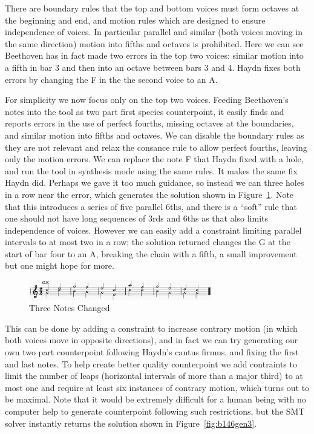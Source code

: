 \documentclass[sigplan,screen]{acmart}
\begin{document}
There are boundary rules that the top and bottom voices must form
octaves at the beginning and end, and motion rules which are designed
to ensure independence of voices. In particular parallel and similar
(both voices moving in the same direction) motion into fifths and
octaves is prohibited. Here we can see Beethoven has in fact made two
errors in the top two voices: similar motion into a fifth in bar 3 and
then into an octave between bars 3 and 4. Haydn fixes both errors by
changing the F in the the second voice to an A.

For simplicity we now focus only on the top two voices. Feeding
Beethoven's notes into the tool as two part first species
counterpoint, it easily finds and reports errors in the use of perfect
fourths, missing octaves at the boundaries, and similar motion into
fifths and octaves. We can disable the boundary rules as they are not
relevant and relax the consance rule to allow perfect fourths, leaving
only the motion errors. We can replace the note F that Haydn fixed
with a hole, and run the tool in synthesis mode using the same
rules. It makes the same fix Haydn did. Perhaps we gave it too much
guidance, so instead we can three holes in a row near the error, which
generates the solution shown in Figure~\ref{fig:b146fix3}. Note that
this introduces a series of five parallel 6ths, and there is a ``soft''
rule that one should not have long sequences of 3rds and 6ths as that
also limits independence of voices. However we can easily add a
constraint limiting parallel intervals to at most two in a row; the
solution returned changes the G at the start of bar four to an A,
breaking the chain with a fifth, a small improvement but one might
hope for more.

\begin{figure}
  \includegraphics[width=8cm]{figures/b146fix3.png}
  \caption{Three Notes Changed}
  \label{fig:b146fix3}
\end{figure}

This can be done by adding a constraint to increase contrary motion
(in which both voices move in opposite directions), and in fact we can
try generating our own two part counterpoint following Haydn's cantus
firmus, and fixing the first and last notes. To help create better
quality counterpoint we add contraints to limit the number of leaps
(horizontal intervals of more than a major third) to at most one and
require at least six instances of contrary motion, which turns out to
be maximal. Note that it would be extremely difficult for a human
being with no computer help to generate counterpoint following such
restrictions, but the SMT solver instantly returns the solution shown
in Figure~\ref{fig:b146gen3}.
\end{document}
